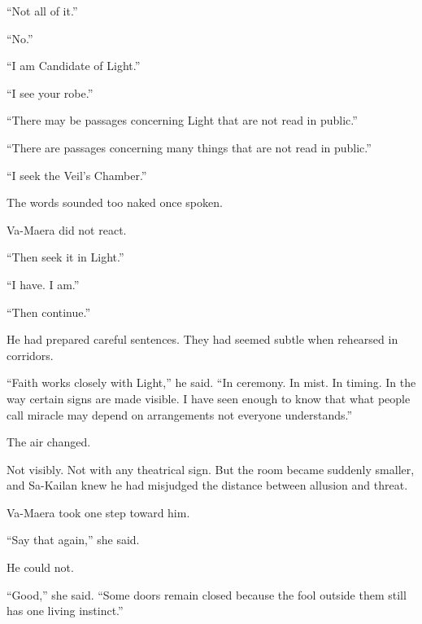 “Not all of it.”\par

“No.”\par

“I am Candidate of Light.”\par

“I see your robe.”\par

“There may be passages concerning Light that are not read in public.”\par

“There are passages concerning many things that are not read in public.”\par

“I seek the Veil’s Chamber.”\par

The words sounded too naked once spoken.\par

Va-Maera did not react.\par

“Then seek it in Light.”\par

“I have. I am.”\par

“Then continue.”\par

He had prepared careful sentences. They had seemed subtle when rehearsed in corridors.\par

“Faith works closely with Light,” he said. “In ceremony. In mist. In timing. In the way certain signs are made visible. I have seen enough to know that what people call miracle may depend on arrangements not everyone understands.”\par

The air changed.\par

Not visibly. Not with any theatrical sign. But the room became suddenly smaller, and Sa-Kailan knew he had misjudged the distance between allusion and threat.\par

Va-Maera took one step toward him.\par

“Say that again,” she said.\par

He could not.\par

“Good,” she said. “Some doors remain closed because the fool outside them still has one living instinct.”\par

